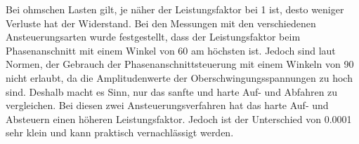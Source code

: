 Bei ohmschen Lasten gilt, je näher der Leistungsfaktor bei 1 ist, desto weniger Verluste hat der Widerstand. Bei den Messungen mit den verschiedenen Ansteuerungsarten wurde festgestellt, dass der Leistungsfaktor beim Phasenanschnitt mit einem Winkel von 60\textdegree \hspace{0.02cm} am höchsten ist. Jedoch sind laut Normen, der Gebrauch der Phasenanschnittsteuerung mit einem Winkeln von 90\textdegree \hspace{0.02cm} nicht erlaubt, da die Amplitudenwerte der Oberschwingungsspannungen zu hoch sind. Deshalb macht es Sinn, nur das sanfte und harte Auf- und Abfahren zu vergleichen. Bei diesen zwei Ansteuerungsverfahren hat das harte Auf- und Absteuern einen höheren Leistungsfaktor. Jedoch ist der Unterschied von 0.0001 sehr klein und kann praktisch vernachlässigt werden.
 



